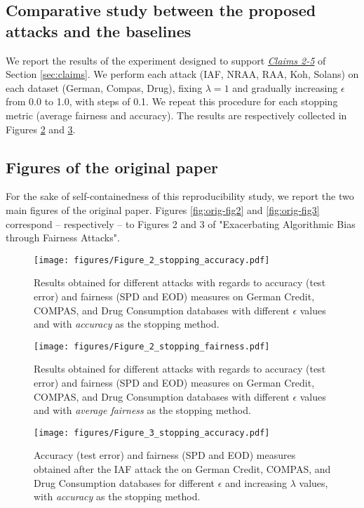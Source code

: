 \subsection{Comparative study between the proposed attacks and the baselines}\label{app:comparative}
We report the results of the experiment designed to support \hyperlink{claim-2}{\textit{Claims 2-5}} of Section \ref{sec:claims}. We perform each attack (IAF, NRAA, RAA, Koh, Solans) on each dataset (German, Compas, Drug), fixing $\lambda = 1$ and gradually increasing $\epsilon$ from 0.0 to 1.0, with steps of 0.1. We repeat this procedure for each stopping metric (average fairness and accuracy). The results are respectively collected in Figures \ref{fig:2-stop-fairness} and \ref{fig:3-stop-accuracy}.

\subsection{Figures of the original paper}\label{app:orig-figs}
For the sake of self-containedness of this reproducibility study, we report the two main figures of the original paper. Figures \ref{fig:orig-fig2} and \ref{fig:orig-fig3} correspond -- respectively -- to Figures 2 and 3 of "Exacerbating Algorithmic Bias through Fairness Attacks".

\begin{figure}[!htb]
    \centering
    \texttt{[image: figures/Figure\_2\_stopping\_accuracy.pdf]}
    \caption{Results obtained for different attacks with regards to accuracy (test error) and fairness (SPD and EOD) measures on German Credit, COMPAS, and Drug Consumption databases with different $\epsilon$ values and with \textit{accuracy} as the stopping method.}
    \label{fig:2-stop-accuracy}
\end{figure}

\begin{figure}[!htb]
    \centering
    \texttt{[image: figures/Figure\_2\_stopping\_fairness.pdf]}
    \caption{Results obtained for different attacks with regards to accuracy (test error) and fairness (SPD and EOD) measures on German Credit, COMPAS, and Drug Consumption databases with different $\epsilon$ values and with \textit{average fairness} as the stopping method.}
    \label{fig:2-stop-fairness}
\end{figure}

\begin{figure}[!htb]
    \centering
    \texttt{[image: figures/Figure\_3\_stopping\_accuracy.pdf]}
    \caption{Accuracy (test error) and fairness (SPD and EOD) measures obtained after the IAF attack the on German Credit, COMPAS, and Drug Consumption databases for different $\epsilon$ and increasing $\lambda$ values,  with \textit{accuracy} as the stopping method.}
    \label{fig:3-stop-accuracy}
\end{figure}

